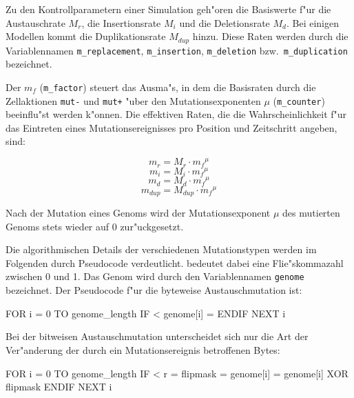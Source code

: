 Zu den Kontrollparametern einer Simulation geh"oren die Basiswerte f"ur die
Austauschrate $M_r$, die Insertionsrate $M_i$ und die Deletionsrate
$M_d$. Bei einigen Modellen kommt die Duplikationsrate $M_{\mathit{dup}}$ hinzu.
Diese Raten werden durch die Variablennamen \verb|m_replacement|, \verb|m_insertion|,
\verb|m_deletion| bzw.\ \verb|m_duplication| bezeichnet.

Der  $m_f$ (\verb|m_factor|) steuert das Ausma"s, in dem die Basisraten
durch die Zellaktionen \verb|mut-| und \verb|mut+| "uber den
Mutationsexponenten $\mu$ (\verb|m_counter|) beeinflu"st werden k"onnen. Die effektiven Raten,
die die Wahrscheinlichkeit f"ur das Eintreten eines Mutationsereignisses
pro Position und Zeitschritt angeben, sind:

\begin{equation}
m_r = M_r \cdot {m_f}^{\mu}
\end{equation}
\begin{equation}
m_i = M_i \cdot {m_f}^{\mu}
\end{equation}
\begin{equation}
m_d = M_d \cdot {m_f}^{\mu}
\end{equation}
\begin{equation}
m_{\mathit{dup}} = M_{\mathit{dup}} \cdot {m_f}^{\mu}
\end{equation}

Nach der Mutation eines Genoms wird der Mutationsexponent $\mu$ des
mutierten Genoms stets wieder auf 0 zur"uckgesetzt.

Die algorithmischen Details der verschiedenen Mutationstypen werden
im Folgenden durch Pseudocode verdeutlicht. 
bedeutet dabei eine Flie"skommazahl zwischen 0 und 1. Das Genom
wird durch den Variablennamen \verb|genome| bezeichnet. Der
Pseudocode f"ur die byteweise Austauschmutation ist:

\begin{verbatimcmd}
FOR i = 0 TO genome_length
  IF  < 
    genome[i] = 
  ENDIF
NEXT i
\end{verbatimcmd}

Bei der bitweisen Austauschmutation unterscheidet sich nur die Art der
Ver"anderung der durch ein Mutationsereignis betroffenen Bytes:

\begin{verbatimcmd}
FOR i = 0 TO genome_length
  IF  < 
    r = 
    flipmask = 
    genome[i] = genome[i] XOR flipmask
  ENDIF
NEXT i
\end{verbatimcmd}

